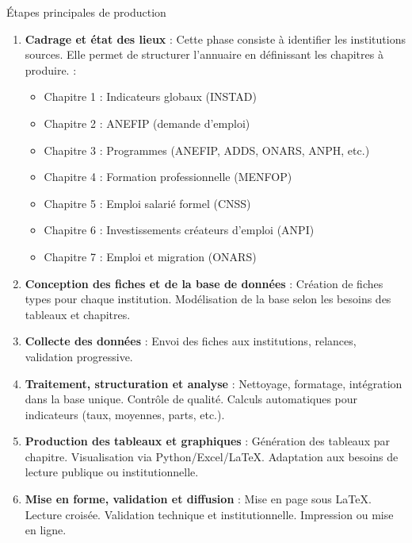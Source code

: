 \documentclass{beamer}
\begin{document}
\begin{frame}{\'Etapes principales de production}
\begin{enumerate}
  \item \textbf{Cadrage et \'etat des lieux} : Cette phase consiste à identifier les institutions sources. Elle permet de structurer l’annuaire en définissant les chapitres à produire. :
    \begin{itemize}
      \item Chapitre 1 : Indicateurs globaux (INSTAD)
      \item Chapitre 2 : ANEFIP (demande d’emploi)
      \item Chapitre 3 : Programmes (ANEFIP, ADDS, ONARS, ANPH, etc.)
      \item Chapitre 4 : Formation professionnelle (MENFOP)
      \item Chapitre 5 : Emploi salarié formel (CNSS)
      \item Chapitre 6 : Investissements créateurs d’emploi (ANPI)
      \item Chapitre 7 : Emploi et migration (ONARS)
    \end{itemize}

  \item \textbf{Conception des fiches et de la base de donn\'ees} : Cr\'eation de fiches types pour chaque institution. Mod\'elisation de la base selon les besoins des tableaux et chapitres.

  \item \textbf{Collecte des donn\'ees} : Envoi des fiches aux institutions, relances, validation progressive.

  \item \textbf{Traitement, structuration et analyse} : Nettoyage, formatage, int\'egration dans la base unique. Contr\^ole de qualit\'e. Calculs automatiques pour indicateurs (taux, moyennes, parts, etc.).

  \item \textbf{Production des tableaux et graphiques} : G\'en\'eration des tableaux par chapitre. Visualisation via Python/Excel/LaTeX. Adaptation aux besoins de lecture publique ou institutionnelle.

  \item \textbf{Mise en forme, validation et diffusion} : Mise en page sous LaTeX. Lecture croisée. Validation technique et institutionnelle. Impression ou mise en ligne.
\end{enumerate}
\end{frame}
\end{document}
